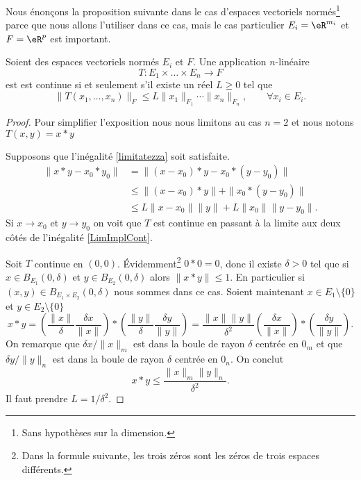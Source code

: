 Nous énonçons la proposition suivante dans le cas d'espaces vectoriels normés\footnote{Sans hypothèses sur la dimension.} parce que nous allons l'utiliser dans ce cas, mais le cas particulier \( E_i=\eR^{m_i}\) et \( F=\eR^p\) est important.
\begin{proposition} \label{PropUADlSMg}
    Soient des espaces vectoriels normés \( E_i\) et \( F\). Une application \( n\)-linéaire
    \begin{equation}
        T\colon E_1\times\ldots\times E_n\to F
    \end{equation}
    est est continue si et seulement s'il existe un réel $L\geq 0$ tel que
  \begin{equation}\label{limitatezza}
     \|T(x_1, \ldots,x_n)\|_F\leq L \|x_1\|_{F_1}\cdots\|x_n\|_{F_n}, \qquad \forall x_i\in E_i.
  \end{equation}
\end{proposition}

\begin{proof}
    Pour simplifier l'exposition nous nous limitons au cas $n=2$ et nous notons $T(x,y)=x*y$

    Supposons que l'inégalité \eqref{limitatezza} soit satisfaite.
    \begin{equation}\label{LimImplCont}
      \begin{aligned}
        \|x*y-x_0*y_0\|&=\|(x-x_0)*y-x_0*(y-y_0)\|\\
    &\leq \|(x-x_0)*y\|+\|x_0*(y-y_0)\|\\
    &\leq L\|x-x_0\|\|y\| + L\|x_0\|\|y-y_0\|.
      \end{aligned}
    \end{equation}
    Si $x\to x_0$ et $y\to y_0$  on voit que $T$ est continue en passant à la limite aux deux côtés de l'inégalité \eqref{LimImplCont}.

    Soit $T$ continue en $(0,0)$. Évidemment\footnote{Dans la formule suivante, les trois zéros sont les zéros de trois espaces différents.} $0*0=0$, donc il existe $\delta>0$ tel que si $x\in B_{E_1}(0,\delta)$ et $y\in B_{E_2}(0,\delta)$ alors $\|x*y\|\leq 1$. En particulier si \( (x,y)\in B_{E_1\times E_2}(0,\delta)\) nous sommes dans ce cas. Soient maintenant  $x\in E_1\setminus\{ 0 \}$  et $y\in E_2\setminus\{ 0\}$
    \begin{equation}
        x*y=\left(\frac{\|x\|}{\delta}\frac{\delta x}{\|x\|}\right)*\left(\frac{\|y\|}{\delta}\frac{\delta y}{\|y\|}\right)
    =\frac{\|x\|\|y\|}{\delta^2} \left(\frac{\delta x}{\|x\|}\right)*\left(\frac{\delta y}{\|y\|}\right).
     \end{equation}
    On remarque que $\delta x/\|x\|_m$ est dans la boule de rayon $\delta$ centrée en $0_m$ et que $\delta y/\|y\|_n$ est dans la boule de rayon $\delta$ centrée en $0_n$. On conclut
    \[
     x*y\leq \frac{\|x\|_m\|y\|_n}{\delta^2}.
    \]
    Il faut prendre $L=1/\delta^2$.
\end{proof}


